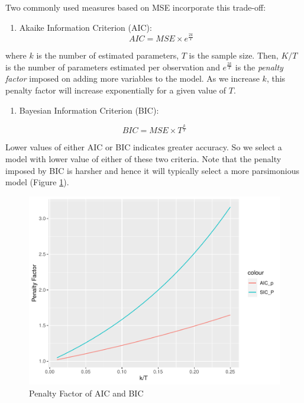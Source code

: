 \documentclass[]{book}
\providecommand{\tightlist}{%
  \setlength{\itemsep}{0pt}\setlength{\parskip}{0pt}}
\theoremstyle{definition}
\theoremstyle{definition}
\theoremstyle{definition}
\theoremstyle{remark}
\begin{document}
Two commonly used measures based on MSE incorporate this trade-off:

\begin{enumerate}
\def\labelenumi{\arabic{enumi}.}
\tightlist
\item
  Akaike Information Criterion (AIC):
  \[ AIC= MSE \times e^{\frac{2k}{T}} \]
\end{enumerate}

where \(k\) is the number of estimated parameters, \(T\) is the sample
size. Then, \(K/T\) is the number of parameters estimated per
observation and \(e^{\frac{2k}{T}}\) is the \emph{penalty factor}
imposed on adding more variables to the model. As we increase \(k\),
this penalty factor will increase exponentially for a given value of
\(T\).

\begin{enumerate}
\def\labelenumi{\arabic{enumi}.}
\setcounter{enumi}{1}
\tightlist
\item
  Bayesian Information Criterion (BIC):
\end{enumerate}

\[ BIC= MSE \times T^{\frac{k}{T}} \]

Lower values of either AIC or BIC indicates greater accuracy. So we
select a model with lower value of either of these two criteria. Note
that the penalty imposed by BIC is harsher and hence it will typically
select a more parsimonious model (Figure \ref{fig:ch2-figure1}).

\begin{figure}

{\centering \includegraphics[width=0.8\linewidth]{bookdown-demo_files/figure-latex/ch2-figure1-1} 

}

\caption{Penalty Factor of AIC and BIC}\label{fig:ch2-figure1}
\end{figure}
\end{document}

